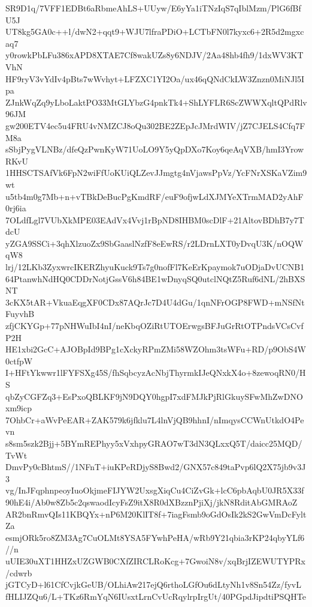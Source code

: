 SR9D1q/7VFF1EDBt6aRbmeAhLS+UUyw/E6yYa1iTNzIqS7qIblMzm/PlG6fBfU5J
UT8kg5GA0c++l/dwN2+qqt9+WJU7lfraPDiO+LCTbFN0l7kyxc6+2R5d2mgxcaq7
y0rowkPbLFu386xAPD8XTAE7Cf8wakUZs8y6NDJV/2Aa48hb4fh9/1dxWV3KTVhN
HF9ryV3vYdIv4pBts7wWvhyt+LFZXC1YI2Oa/ux46qQNdCkLW3Znzn0MiNJl5Ipa
ZJnkWqZq9yLboLaktPO33MtGLYbzG4pnkTk4+ShLYFLR6ScZWWXqltQPdRlv96JM
gw200ETV4ec5u4FRU4vNMZCJ8oQu302BE2ZEpJcJMrdWIV/jZ7CJELS4Cfq7FM8a
sSbjPygVLNBz/dfeQzPwnKyW71UoLO9Y5yQpDXo7Koy6qeAqVXB/hmI3YrowRKvU
1HHSCTSAfVk6FpN2wiFfUoKUiQLZevJJmgtg4nVjawsPpVz/YcFNrXSKaVZim9wt
u5tb4m0g7Mb+n+vTBkDeBucPgKmdRF/euF9ofjwLdXJMYeXTrmMAD2yAhF0rj6ia
7OLdfLgl7VUbXkMPE03EAdVx4Vvj1rBpND8IHBM0scDlF+21AltovBDhB7y7TdcU
yZGA9SSCi+3qhXlzuoZx9SbGaaslNzfF8eEwRS/r2LDrnLXT0yDvqU3K/nOQWqW8
lrj/12LKb3ZyxwrcIKERZhyuKuck9Ts7g0nofFl7KeErKpaymok7uODjaDvUCNB1
64PtanwhNdHQ0CDDrNotjGssV6h84BE1wDnyqSQ0utclNQtZ5Ruf6dNL/2hBXSNT
3cKX5tAR+VkuaEqgXF0CDx87AQrJc7D4U4dGu/1qnNFrOGP8FWD+mNSfNtFuyvhB
zfjCKYGp+77pNHWuIbI4nI/neKbqOZiRtUTOErwgsBFJuGrRtOTPndsVCsCvfP2H
HE1xbi2GcC+AJOBpId9BPg1cXckyRPmZMi58WZOhm3tsWFu+RD/p9ObS4W0ctfpW
I+HFtYkwwr1lFYFSXg45S/fhSqbcyzAcNbjThyrmkIJeQNxkX4o+8zewoqRN0/HS
qbZyCGFZq3+EsPxoQBLKF9jN9DQY0hgpI7xdFMJkPjRlGkuySFwMhZwDNOxm9icp
7OhbCr+aWvPeEAR+ZAK579k6jfklu7L4lnVjQB9hhnI/nImqysCCWnUtkdO4Pevn
s8sm5szk2Bjj+5BYmREPhyy5xVxhpyGRAO7wT3dN3QLxxQ5T/daicc25MQD/TvWt
DmvPy0cBhtmS//1NFnT+iuKPeRDjyS8Bwd2/GNX57c849taPvp6lQ2X75jb9v3J3
vg/InJFqphnpeoyIuoOkjmeFIJYW2UxsgXiqCu4CiZvGk+lcC6pbAqbU0JR5X33f
90hE4i/Ab0w8Zb5c2qswaodIcyFsZ9itX8R0dXBzznPjiXj/jkN8RditAbGMRAoZ
AR2bnRmvQIs11KBQYx+nP6M20KlIT8f+7iagFsmb9oGdOsIk2kS2GwVmDcFyltZa
esmjORk5ro8ZM3Ag7CuOLMt8YSA5FYwhPeHA/wRb9Y21qbia3rKP24qbyYLf6//n
uUIE30uXT1HHZxUZGWB0CXfZIRCLRoKcg+7GwoiN8v/xqBrjIZEWUTYPRx/cdwrb
jGTCyD+l61CfCvjkGeUB/OLhiAw217ejQ6rthoLGfOu6dLtyNh1v8Sn54Zz/fyvL
fHLIJZQu6/L+TKz6RmYqN6IUsxtLrnCvUcRqylrpIrgUt/40PGpdJipdtiPSQHTe
